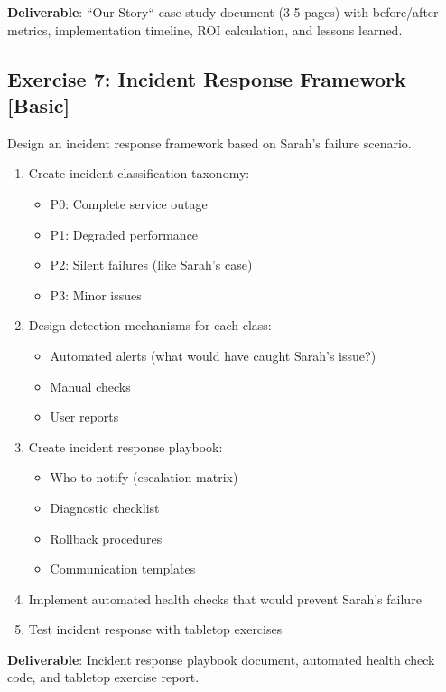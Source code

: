 \textbf{Deliverable}: ``Our Story`` case study document (3-5 pages) with before/after metrics, implementation timeline, ROI calculation, and lessons learned.

\subsection{Exercise 7: Incident Response Framework [Basic]}

Design an incident response framework based on Sarah's failure scenario.

\begin{enumerate}
    \item Create incident classification taxonomy:
        \begin{itemize}
            \item P0: Complete service outage
            \item P1: Degraded performance
            \item P2: Silent failures (like Sarah's case)
            \item P3: Minor issues
        \end{itemize}
    \item Design detection mechanisms for each class:
        \begin{itemize}
            \item Automated alerts (what would have caught Sarah's issue?)
            \item Manual checks
            \item User reports
        \end{itemize}
    \item Create incident response playbook:
        \begin{itemize}
            \item Who to notify (escalation matrix)
            \item Diagnostic checklist
            \item Rollback procedures
            \item Communication templates
        \end{itemize}
    \item Implement automated health checks that would prevent Sarah's failure
    \item Test incident response with tabletop exercises
\end{enumerate}

\textbf{Deliverable}: Incident response playbook document, automated health check code, and tabletop exercise report.

